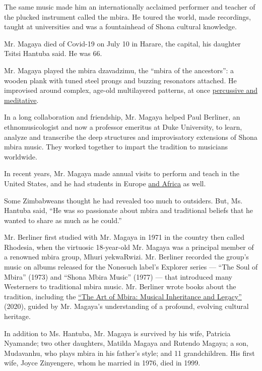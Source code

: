 The same music made him an internationally acclaimed performer and
teacher of the plucked instrument called the mbira. He toured the world,
made recordings, taught at universities and was a fountainhead of Shona
cultural knowledge.

Mr. Magaya died of Covid-19 on July 10 in Harare, the capital, his
daughter Tsitsi Hantuba said. He was 66.

Mr. Magaya played the mbira dzavadzimu, the ``mbira of the ancestors'':
a wooden plank with tuned steel prongs and buzzing resonators attached.
He improvised around complex, age-old multilayered patterns, at once
\href{https://www.youtube.com/watch?\&v=TS5ASXu44bQ}{percussive and
meditative}.

In a long collaboration and friendship, Mr. Magaya helped Paul Berliner,
an ethnomusicologist and now a professor emeritus at Duke University, to
learn, analyze and transcribe the deep structures and improvisatory
extensions of Shona mbira music. They worked together to impart the
tradition to musicians worldwide.

In recent years, Mr. Magaya made annual visits to perform and teach in
the United States, and he had students in Europe
\href{https://www.youtube.com/watch?v=ZzOjBJadc_A}{and Africa} as well.

Some Zimbabweans thought he had revealed too much to outsiders. But, Ms.
Hantuba said, ``He was so passionate about mbira and traditional beliefs
that he wanted to share as much as he could.''

Mr. Berliner first studied with Mr. Magaya in 1971 in the country then
called Rhodesia, when the virtuosic 18-year-old Mr. Magaya was a
principal member of a renowned mbira group, Mhuri yekwaRwizi. Mr.
Berliner recorded the group's music on albums released for the Nonesuch
label's Explorer series --- ``The Soul of Mbira'' (1973) and ``Shona
Mbira Music'' (1977) --- that introduced many Westerners to traditional
mbira music. Mr. Berliner wrote books about the tradition, including the
\href{https://press.uchicago.edu/ucp/books/book/chicago/A/bo38181879.html}{``The
Art of Mbira: Musical Inheritance and Legacy''} (2020), guided by Mr.
Magaya's understanding of a profound, evolving cultural heritage.

In addition to Ms. Hantuba, Mr. Magaya is survived by his wife, Patricia
Nyamande; two other daughters, Matilda Magaya and Rutendo Magaya; a son,
Mudavanhu, who plays mbira in his father's style; and 11 grandchildren.
His first wife, Joyce Zinyengere, whom he married in 1976, died in 1999.

